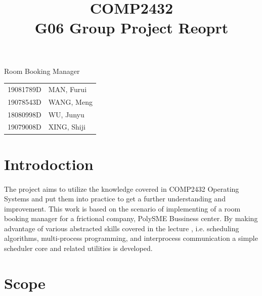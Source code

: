 \documentclass{article}
\title{\begin{center}\Huge COMP2432\\
    G06 Group Project Reoprt\end{center}}
\date{}
\author{}
\begin{document}
    \begin{titlepage}
        \maketitle
        \begin{center}
            \huge Room Booking Manager
            \vfill
            \begin{table}[!htbp]
                \centering
                \huge
                \begin{tabular}{ll}
                    19081789D\hspace{0.25in}&MAN, Furui \\
                    19078543D\hspace{0.25in}&WANG, Meng \\
                    18080998D\hspace{0.25in}&WU, Junyu  \\
                    19079008D\hspace{0.25in}&XING, Shiji\\
                \end{tabular}
            \end{table}
            \vspace{0.5in}
            \thispagestyle{empty}
        \end{center}
    \end{titlepage}
    \cleardoublepage
    \tableofcontents
    \thispagestyle{empty}
    \cleardoublepage
    \setcounter{page}{1}
    \section{Introdoction}
        \paragraph{}
        The project aims to utilize the knowledge covered in COMP2432 Operating Systems
        and put them into practice to get a further understanding and improvement. 
        This work is based on the scenario of implementing of a room booking manager
        for a frictional company, PolySME Bussiness center. By making advantage of
        various abstracted skills covered in the lecture , i.e. scheduling algorithms,
        multi-process programming, and interprocess communication a simple scheduler
        core and related utilities is developed.
    \section{Scope}
\end{document}
